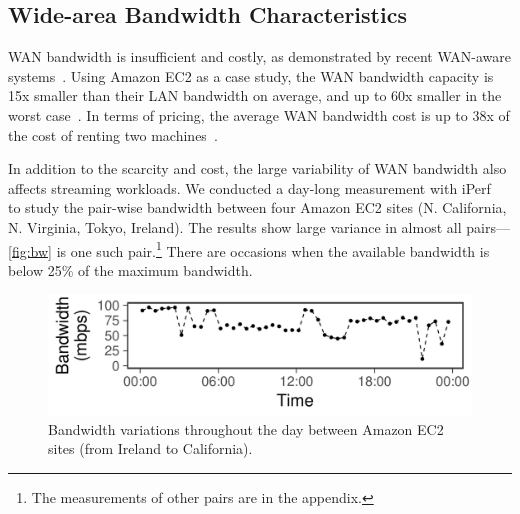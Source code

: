 

\subsection{Wide-area Bandwidth Characteristics}
\label{sec:wide-area-bandwidth}

WAN bandwidth is insufficient and costly, as demonstrated by recent WAN-aware
systems~\cite{hsieh17gaia, pu2015low, vulimiri2015wananlytics,
  vulimiri2015global}. Using Amazon EC2 as a case study, the WAN bandwidth
capacity is 15x smaller than their LAN bandwidth on average, and up to 60x
smaller in the worst case~\cite{hsieh17gaia}. In terms of pricing, the average
WAN bandwidth cost is up to 38x of the cost of renting two
machines~\cite{amazon2017pricing, hsieh17gaia}.

In addition to the scarcity and cost, the large variability of WAN bandwidth
also affects streaming workloads. We conducted a day-long measurement with
iPerf~\cite{iperf3} to study the pair-wise bandwidth between four Amazon EC2
sites (N. California, N. Virginia, Tokyo, Ireland).  The results show large
variance in almost all pairs---\autoref{fig:bw} is one such pair.\footnote{The
  measurements of other pairs are in the appendix.} There are occasions when the
available bandwidth is below 25\% of the maximum bandwidth.

\begin{figure}
  \centering
  \includegraphics[width=0.9\linewidth]{figures/aws-variation.pdf}
  \vspace{-0.8em}
  \caption{Bandwidth variations throughout the day between Amazon EC2 sites
    (from Ireland to California).}
  \label{fig:bw}
  \vspace{-1em}
\end{figure}


